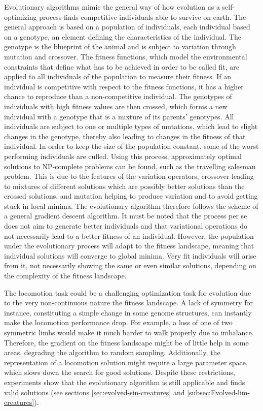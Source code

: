 \documentclass[main]{subfiles}
\begin{document}
Evolutionary algorithms mimic the general way of how evolution as a self-optimizing process finds competitive individuals able to survive on earth. %
%
The general approach is based on a population of individuals, each individual based on a genotype, an element defining the characteristics of the individual. %
%
The genotype is the blueprint of the animal and is subject to variation through mutation and crossover. %
%
The fitness functions, which model the environmental constraints that define what has to be achieved in order to be called fit, are applied to all individuals of the population to measure their fitness. %
%
If an individual is competitive with respect to the fitness functions, it has a higher chance to reproduce than a non-competitive individual. %
%
The genotypes of individuals with high fitness values are then crossed, which forms a new individual with a genotype that is a mixture of its parents' genotypes. %
%
All individuals are subject to one or multiple types of mutations, which lead to slight changes in the genotype, thereby also leading to changes in the fitness of that individual. %
%
In order to keep the size of the population constant, some of the worst performing individuals are culled. %
%
Using this process, approximately optimal solutions to NP-complete problems can be found, such as the travelling salesman problem. %
%
This is due to the features of the variation operators, crossover leading to mixtures of different solutions which are possibly better solutions than the crossed solutions, and mutation helping to produce variation and to avoid getting stuck in local minima. %
%
The evolutionary algorithm therefore follows the scheme of a general gradient descent algorithm. %
%
It must be noted that the process per se does not aim to generate better individuals and that variational operations do not necessarily lead to a better fitness of an individual. %
%
However, the population under the evolutionary process will adapt to the fitness landscape, meaning that individual solutions will converge to global minima. %
%
Very fit individuals will arise from it, not necessarily showing the same or even similar solutions, depending on the complexity of the fitness landscape. 


The locomotion task could be a challenging optimization task for evolution due to the very non-continuous nature the fitness landscape. %
%
A lack of symmetry for instance, constituting a simple change in some genome structures, can instantly make the locomotion performance drop. %
For example, a loss of one of two symmetric limbs would make it much harder to walk properly due to imbalance. %
%
Therefore, the gradient on the fitness landscape might be of little help in some areas, degrading the algorithm to random sampling. %
%
Additionally, the representation of a locomotion solution might require a large parameter space, which slows down the search for good solutions. %
%
Despite these restrictions, experiments show that the evolutionary algorithm is still applicable and finds valid solutions (see sections \ref{sec:evolved-sin-creatures} and \ref{subsec:Evolved-lim-creatures}).
\end{document}
